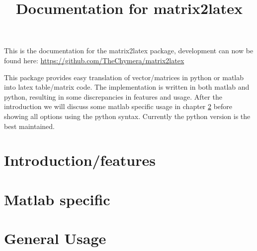 




\title{Documentation for matrix2latex}


\maketitle
This is the documentation for the matrix2latex package, development can now be found here:
\url{https://github.com/TheChymera/matrix2latex}

This package provides easy translation of vector/matrices in python or matlab into latex table/matrix code.
The implementation is written in both matlab and python, resulting in some discrepancies in features and usage.
After the introduction we will discuss some
matlab specific usage in chapter \ref{sec:matlab} before showing
all options using the python syntax. Currently the python version is the best maintained.
\chapter{Introduction/features}
\label{sec:introduction}


\chapter{Matlab specific}
\label{sec:matlab}


\chapter{General Usage}
\label{sec:python}


 
